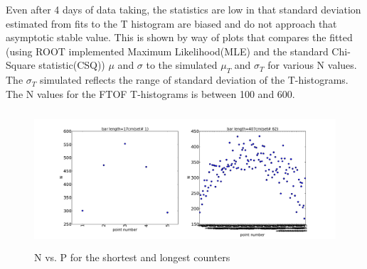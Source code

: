 \documentclass[12pt]{article}
\begin{document}
Even after 4 days of data taking, the statistics are low in that standard deviation estimated from fits to the T histogram are biased and do not approach that asymptotic stable value. This is shown by way of plots that compares the fitted (using ROOT implemented Maximum Likelihood(MLE) and the standard Chi-Square statistic(CSQ)) $\mu$ and $\sigma$ to the simulated $\mu_{T}$ and $\sigma_{T}$ for various N values. The $\sigma_{T}$ simulated reflects the range of standard deviation of the T-histograms. The N values for the FTOF T-histograms is between 100 and 600.

\begin{figure}[ht]
	\includegraphics[height=2in,width=5in]{bar_stats_write-up_N-vs-p.pdf}
	\caption{N vs. P for the shortest and longest counters}
	\label{fig1}
\end{figure}

\end{document}
